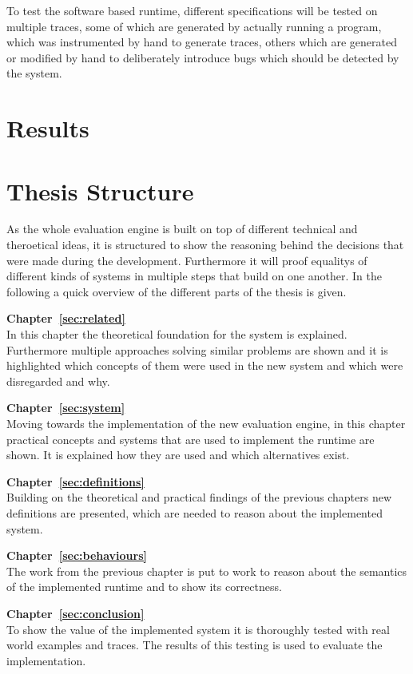 To test the software based runtime, different specifications will be tested on multiple traces, some of which are generated by actually running a program,
which was instrumented by hand to generate traces, others which are generated or modified by hand to deliberately introduce bugs which should be detected by the system.

\section{Results}
\label{sec:intro:results}


\section{Thesis Structure}
\label{sec:intro:structure}

As the whole evaluation engine is built on top of different technical and theroetical ideas, it is structured to show
the reasoning behind the decisions that were made during the development.
Furthermore it will proof equalitys of different kinds of systems in multiple steps that build on one another.
In the following a quick overview of the different parts of the thesis is given.

\textbf{Chapter~\ref{sec:related}} \\[0.2em]

In this chapter the theoretical foundation for the system is explained.
Furthermore multiple approaches solving similar problems are shown and it is highlighted which concepts of them were
used in the new system and which were disregarded and why.

\textbf{Chapter~\ref{sec:system}} \\[0.2em]

Moving towards the implementation of the new evaluation engine, in this chapter practical concepts and systems that are used to implement the runtime are shown.
It is explained how they are used and which alternatives exist.

\textbf{Chapter~\ref{sec:definitions}} \\[0.2em]

Building on the theoretical and practical findings of the previous chapters new definitions are presented, which are needed to reason about the implemented system.

\textbf{Chapter~\ref{sec:behaviours}} \\[0.2em]

The work from the previous chapter is put to work to reason about the semantics of the implemented runtime and to show its correctness.

\textbf{Chapter~\ref{sec:conclusion}} \\[0.2em]

To show the value of the implemented system it is thoroughly tested with real world examples and traces.
The results of this testing is used to evaluate the implementation.

